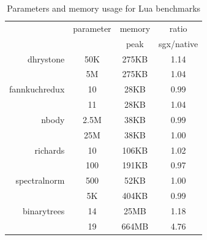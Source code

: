 \newcommand{\higparamcolor}{\rowcolor[rgb]{0.79,0.91,0.90}\cellcolor{white}}
\newcommand{\lowparamcolor}{\rowcolor[rgb]{0.94,0.88,0.76}\cellcolor{white}}
\begin{table}[t!]
    \centering
    \begin{tabular}{r|c|c|c}
               &parameter  &memory      &ratio \\
               &           &peak        &sgx/native \\
    \hline
\lowparamcolor
dhrystone      &50K        &275KB       & 1.14 \\
\higparamcolor
               &5M         &275KB       & 1.04 \\
    \hline
\lowparamcolor
fannkuchredux  &10         &28KB        & 0.99 \\
\higparamcolor
               &11         &28KB        & 1.04 \\
    \hline
\lowparamcolor
nbody          &2.5M       &38KB        & 0.99 \\
\higparamcolor
               &25M        &38KB        & 1.00 \\
    \hline
\lowparamcolor
richards       &10         &106KB       & 1.02 \\
\higparamcolor
               &100        &191KB       & 0.97 \\
    \hline
\lowparamcolor
spectralnorm   &500        &52KB        & 1.00 \\
\higparamcolor
               &5K         &404KB       & 0.99 \\
    \hline
\lowparamcolor
binarytrees    &14         &25MB        & 1.18 \\
\higparamcolor
               &19         &664MB       & 4.76 \\
    \end{tabular}
    \caption{Parameters and memory usage for Lua benchmarks}
	\label{tab:luabmarks}
\end{table}

